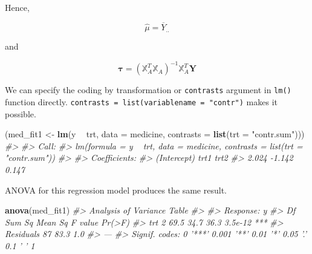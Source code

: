 \documentclass[]{book}
\newenvironment{Shaded}{\begin{snugshade}}{\end{snugshade}}
\newcommand{\CommentTok}[1]{\textcolor[rgb]{0.56,0.35,0.01}{\textit{#1}}}
\newcommand{\DataTypeTok}[1]{\textcolor[rgb]{0.13,0.29,0.53}{#1}}
\newcommand{\KeywordTok}[1]{\textcolor[rgb]{0.13,0.29,0.53}{\textbf{#1}}}
\newcommand{\NormalTok}[1]{#1}
\newcommand{\OperatorTok}[1]{\textcolor[rgb]{0.81,0.36,0.00}{\textbf{#1}}}
\newcommand{\StringTok}[1]{\textcolor[rgb]{0.31,0.60,0.02}{#1}}
\theoremstyle{definition}
\theoremstyle{definition}
\theoremstyle{definition}
\theoremstyle{remark}
\begin{document}
Hence,

\[\hat\mu = \overline{Y}_{..}\]

and

\[\boldsymbol\tau = (\mathbb{X}_A^T \mathbb{X}_A)^{-1} \mathbb{X}_A^T \mathbf{Y}\]

\begin{Shaded}
\end{Shaded}

We can specify the coding by transformation or \texttt{contrasts} argument in \texttt{lm()} function directly. \texttt{contrasts\ =\ list(variablename\ =\ "contr")} makes it possible.

\begin{Shaded}
\begin{Highlighting}[]
\NormalTok{(med_fit1 <-}\StringTok{ }\KeywordTok{lm}\NormalTok{(y }\OperatorTok{~}\StringTok{ }\NormalTok{trt, }\DataTypeTok{data =}\NormalTok{ medicine, }\DataTypeTok{contrasts =} \KeywordTok{list}\NormalTok{(}\DataTypeTok{trt =} \StringTok{"contr.sum"}\NormalTok{)))}
\CommentTok{#> }
\CommentTok{#> Call:}
\CommentTok{#> lm(formula = y ~ trt, data = medicine, contrasts = list(trt = "contr.sum"))}
\CommentTok{#> }
\CommentTok{#> Coefficients:}
\CommentTok{#> (Intercept)         trt1         trt2  }
\CommentTok{#>       2.024       -1.142        0.147}
\end{Highlighting}
\end{Shaded}

ANOVA for this regression model produces the same result.

\begin{Shaded}
\begin{Highlighting}[]
\KeywordTok{anova}\NormalTok{(med_fit1)}
\CommentTok{#> Analysis of Variance Table}
\CommentTok{#> }
\CommentTok{#> Response: y}
\CommentTok{#>           Df Sum Sq Mean Sq F value  Pr(>F)    }
\CommentTok{#> trt        2   69.5    34.7    36.3 3.5e-12 ***}
\CommentTok{#> Residuals 87   83.3     1.0                    }
\CommentTok{#> ---}
\CommentTok{#> Signif. codes:  0 '***' 0.001 '**' 0.01 '*' 0.05 '.' 0.1 ' ' 1}
\end{Highlighting}
\end{Shaded}
\end{document}

